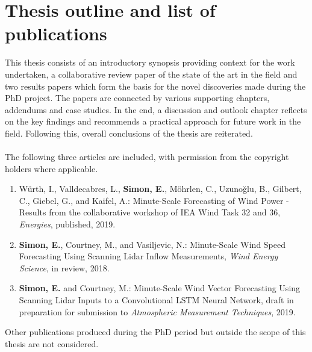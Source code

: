 \chapter{Thesis outline and list of publications}
\label{sec:outline}


This thesis consists of an introductory synopsis providing context for the work undertaken, a collaborative review paper of the state of the art in the field and two results papers which form the basis for the novel discoveries made during the PhD project. The papers are connected by various supporting chapters, addendums and case studies. In the end, a discussion and outlook chapter reflects on the key findings and recommends a practical approach for future work in the field. Following this, overall conclusions of the thesis are reiterated.
\\\\
The following three articles are included, with permission from the copyright holders where applicable.
\\
\begin{enumerate}
    \item W\"urth, I., Valldecabres, L., \textbf{Simon, E.}, M\"ohrlen, C., Uzuno\u glu, B., Gilbert, C., Giebel, G., and Kaifel, A.: Minute-Scale Forecasting of Wind Power - Results from the collaborative workshop of IEA Wind Task 32 and 36, \textit{Energies}, published, 2019.
    
    \item \textbf{Simon, E.}, Courtney, M., and Vasiljevic, N.: Minute-Scale Wind Speed Forecasting Using Scanning Lidar Inflow Measurements, \textit{Wind Energy Science}, in review, 2018.
    
    \item \textbf{Simon, E.} and Courtney, M.: Minute-Scale Wind Vector Forecasting Using Scanning Lidar Inputs to a Convolutional LSTM Neural Network, draft in preparation for submission to \textit{Atmospheric Measurement Techniques}, 2019.

\end{enumerate}

\noindent
Other publications produced during the PhD period but outside the scope of this thesis are not considered.